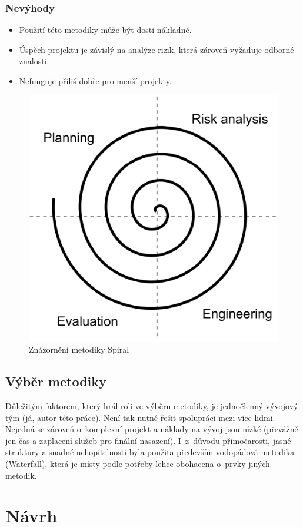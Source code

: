 \documentclass[thesis=M,czech]{FITthesis}[2019/12/23]
\begin{document}
\subsection*{Nevýhody}
\begin{itemize}
    \item Použití této metodiky může být dosti nákladné.
    \item Úspěch projektu je závislý na analýze rizik, která zároveň vyžaduje odborné znalosti.
    \item Nefunguje příliš dobře pro menší projekty.
\end{itemize}

\begin{figure}
	\centering
	\includegraphics[width=0.5\linewidth]{images/spiral.pdf}
  	\caption{Znázornění metodiky Spiral}
  	\label{dia:spiral}
\end{figure}

\section{Výběr metodiky}
Důležitým faktorem, který hrál roli ve výběru metodiky, je jednočlenný vývojový tým (já, autor této práce). Není tak nutné řešit spolupráci mezi více lidmi. Nejedná se zároveň o~komplexní projekt a náklady na vývoj jsou nízké (převážně jen čas a zaplacení služeb pro finální nasazení). I~z~důvodu přímočarosti, jasné struktury a snadné uchopitelnosti byla použita především vodopádová metodika (Waterfall), která je místy podle potřeby lehce obohacena o~prvky jiných metodik.


\chapter{Návrh}
\end{document}
